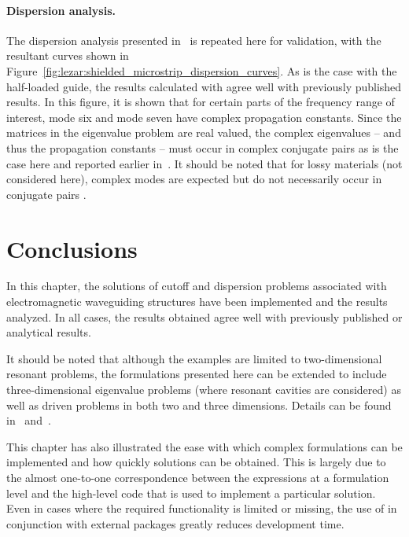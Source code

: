 \paragraph{Dispersion analysis.}

The dispersion analysis presented in~\citet{PelosiCoccioliSelleri1998}
is repeated here for validation, with the resultant curves shown in
Figure~\ref{fig:lezar:shielded_microstrip_dispersion_curves}. As is the
case with the half-loaded guide, the results calculated with \fenics{}
agree well with previously published results. In this figure, it is shown
that for certain parts of the frequency range of interest, mode six
and mode seven have complex propagation constants. Since the matrices in the
eigenvalue problem are real valued, the complex eigenvalues -- and thus
the propagation constants -- must occur in complex conjugate pairs as
is the case here and reported earlier in~\citet{HuangItoh1988}. It
should be noted that for lossy materials (not considered here),
complex modes are expected but do not necessarily occur in conjugate
pairs \citep{PelosiCoccioliSelleri1998}.

\section{Conclusions}

In this chapter, the solutions of cutoff and dispersion problems
associated with electromagnetic waveguiding structures have been
implemented and the results analyzed. In all cases, the results obtained
agree well with previously published or analytical results.

It should be noted that although the examples are limited to
two-dimensional resonant problems, the formulations presented here can
be extended to include three-dimensional eigenvalue problems (where
resonant cavities are considered) as well as driven problems in both
two and three dimensions. Details can be found in~\citet{Jin2002}
and~\citet{PelosiCoccioliSelleri1998}.

This chapter has also illustrated the ease with which complex formulations
can be implemented and how quickly solutions can be obtained. This
is largely due to the almost one-to-one correspondence between the
expressions at a formulation level and the high-level \fenics{} code
that is used to implement a particular solution. Even in cases where
the required functionality is limited or missing, the use of \fenics{}
in conjunction with external packages greatly reduces development time.

